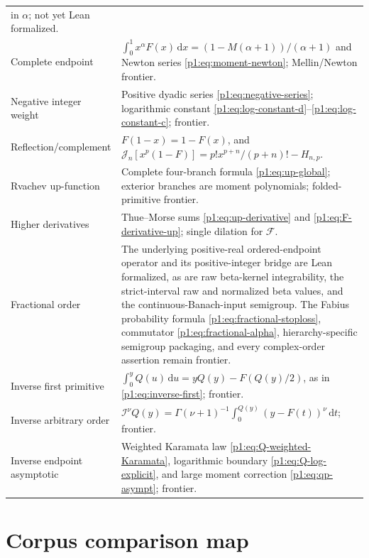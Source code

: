 \documentclass[11pt,oneside]{article}
\theoremstyle{definition}
\theoremstyle{remark}
\newcommand{\Fs}{\mathcal F}
\newcommand{\dd}{\,\mathrm d}
\newcommand{\Jn}{\mathcal J}
\newcommand{\RL}{\mathcal I}
\newcommand{\1}{\mathbf 1}
\begin{document}
\begin{longtable}{@{}p{}p{}@{}}
in \(\alpha\); not yet Lean formalized.\\[1mm]
Complete endpoint&
\(\int_0^1x^\alpha F(x)\dd x=(1-M(\alpha+1))/(\alpha+1)\) and
Newton series \eqref{p1:eq:moment-newton}; Mellin/Newton frontier.\\[1mm]
Negative integer weight&
Positive dyadic series \eqref{p1:eq:negative-series}; logarithmic constant
\eqref{p1:eq:log-constant-d}--\eqref{p1:eq:log-constant-c}; frontier.\\[1mm]
Reflection/complement&
\(F(1-x)=1-F(x)\), and
\(\Jn_n[x^p(1-F)]=p!x^{p+n}/(p+n)!-H_{n,p}\).\\[1mm]
Rvachev up-function&
Complete four-branch formula \eqref{p1:eq:up-global}; exterior branches are
moment polynomials; folded-primitive frontier.\\[1mm]
Higher derivatives&
Thue--Morse sums \eqref{p1:eq:up-derivative} and
\eqref{p1:eq:F-derivative-up}; single dilation for \(\Fs\).\\[1mm]
Fractional order&
The underlying positive-real ordered-endpoint operator and its positive-integer bridge are
Lean formalized, as are raw beta-kernel integrability, the strict-interval raw and
normalized beta values, and the continuous-Banach-input semigroup.  The Fabius probability
formula \eqref{p1:eq:fractional-stoploss}, commutator
\eqref{p1:eq:fractional-alpha}, hierarchy-specific semigroup packaging, and every
complex-order assertion remain frontier.\\[1mm]
Inverse first primitive&
\(\int_0^yQ(u)\dd u=yQ(y)-F(Q(y)/2)\), as in
\eqref{p1:eq:inverse-first}; frontier.\\[1mm]
Inverse arbitrary order&
\(\RL^\nu Q(y)=\Gamma(\nu+1)^{-1}\int_0^{Q(y)}(y-F(t))^\nu\dd t\);
frontier.\\[1mm]
Inverse endpoint asymptotic&
Weighted Karamata law \eqref{p1:eq:Q-weighted-Karamata}, logarithmic boundary
\eqref{p1:eq:Q-log-explicit}, and large moment correction \eqref{p1:eq:qp-asympt};
frontier.\\
\bottomrule
\end{longtable}

\appendix

\section{Corpus comparison map}
\end{document}
